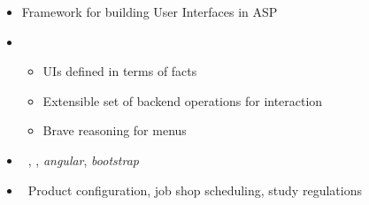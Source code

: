 \begin{frame}{\clinguin}
  \begin{itemize}
    \item {} Framework for building User Interfaces in ASP
    \item {}
      \begin{itemize}
      \item UIs defined in terms of facts
      \item Extensible set of backend operations for interaction
      \item Brave reasoning for menus
      \end{itemize}
    \item {} \ \clingo, \clorm, \textit{angular}, \textit{bootstrap}
    \item {} \ Product configuration, job shop scheduling, study regulations
  \end{itemize}
\end{frame}
%
